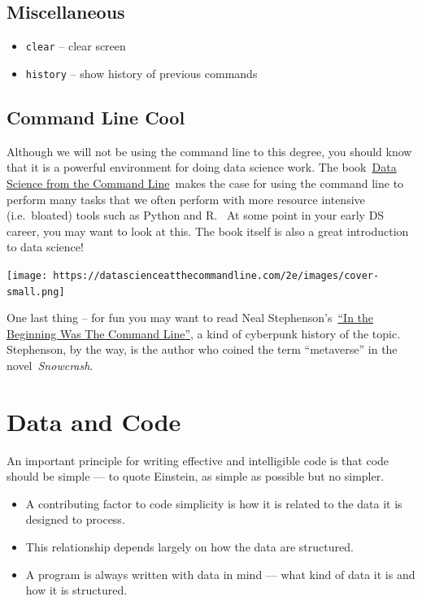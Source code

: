 \documentclass[
  letterpaper,
  DIV=11,
  numbers=noendperiod]{scrreport}
\providecommand{\tightlist}{%
  \setlength{\itemsep}{0pt}\setlength{\parskip}{0pt}}\usepackage{longtable,booktabs,array}
\begin{document}
\hypertarget{miscellaneous}{%
\section{Miscellaneous}\label{miscellaneous}}

\begin{itemize}
\tightlist
\item
  \texttt{clear} -- clear screen
\item
  \texttt{history} -- show history of previous commands
\end{itemize}

\hypertarget{command-line-cool}{%
\section{Command Line Cool}\label{command-line-cool}}

Although we will not be using the command line to this degree, you
should know that it is a powerful environment for doing data science
work. The book~\href{https://datascienceatthecommandline.com/2e/}{Data
Science from the Command Line}~makes the case for using the command line
to perform many tasks that we often perform with more resource intensive
(i.e.~bloated) tools such as Python and R.~ At some point in your early
DS career, you may want to look at this. The book itself is also a great
introduction to data science!

\texttt{[image: https://datascienceatthecommandline.com/2e/images/cover-small.png]}

One last thing -- for fun you may want to read Neal
Stephenson's~\href{http://project.cyberpunk.ru/lib/in_the_beginning_was_the_command_line/}{``In
the Beginning Was The Command Line''}, a kind of cyberpunk history of
the topic. Stephenson, by the way, is the author who coined the term
``metaverse'' in the novel~\emph{Snowcrash}.

\hypertarget{data-and-code}{%
\chapter{Data and Code}\label{data-and-code}}

An important principle for writing effective and intelligible code is
that code should be simple --- to quote Einstein, as simple as possible
but no simpler.

\begin{itemize}
\tightlist
\item
  A contributing factor to code simplicity is how it is related to the
  data it is designed to process.
\item
  This relationship depends largely on how the data are structured.
\item
  A program is always written with data in mind --- what kind of data it
  is and how it is structured.
\end{itemize}
\end{document}
